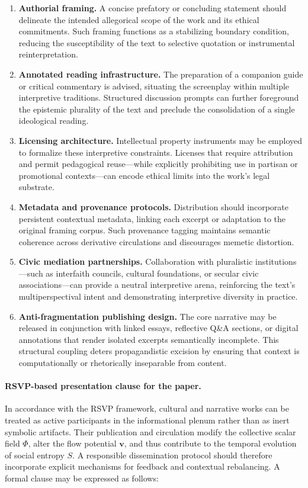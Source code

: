 \documentclass[12pt]{article}
\begin{document}
\begin{enumerate}[label=(\alph*)]
\item \textbf{Authorial framing.}
A concise prefatory or concluding statement should delineate the intended allegorical scope of the work and its ethical commitments. Such framing functions as a stabilizing boundary condition, reducing the susceptibility of the text to selective quotation or instrumental reinterpretation.

\item \textbf{Annotated reading infrastructure.}
The preparation of a companion guide or critical commentary is advised, situating the screenplay within multiple interpretive traditions. Structured discussion prompts can further foreground the epistemic plurality of the text and preclude the consolidation of a single ideological reading.

\item \textbf{Licensing architecture.}
Intellectual property instruments may be employed to formalize these interpretive constraints. Licenses that require attribution and permit pedagogical reuse—while explicitly prohibiting use in partisan or promotional contexts—can encode ethical limits into the work’s legal substrate.

\item \textbf{Metadata and provenance protocols.}
Distribution should incorporate persistent contextual metadata, linking each excerpt or adaptation to the original framing corpus. Such provenance tagging maintains semantic coherence across derivative circulations and discourages memetic distortion.

\item \textbf{Civic mediation partnerships.}
Collaboration with pluralistic institutions—such as interfaith councils, cultural foundations, or secular civic associations—can provide a neutral interpretive arena, reinforcing the text’s multiperspectival intent and demonstrating interpretive diversity in practice.

\item \textbf{Anti-fragmentation publishing design.}
The core narrative may be released in conjunction with linked essays, reflective Q&A sections, or digital annotations that render isolated excerpts semantically incomplete. This structural coupling deters propagandistic excision by ensuring that context is computationally or rhetorically inseparable from content.
\end{enumerate}

\paragraph{RSVP-based presentation clause for the paper.}  
In accordance with the RSVP framework, cultural and narrative works can be treated as active participants in the informational plenum rather than as inert symbolic artifacts. Their publication and circulation modify the collective scalar field \(\Phi\), alter the flow potential \(\mathbf{v}\), and thus contribute to the temporal evolution of social entropy \(S\).  
A responsible dissemination protocol should therefore incorporate explicit mechanisms for feedback and contextual rebalancing. A formal clause may be expressed as follows:
\end{document}
